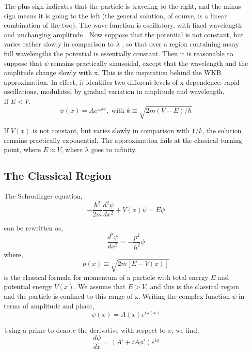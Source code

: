 The plus sign indicates that the particle is traveling to the right, and the minus sign means it is going to the
left (the general solution, of course, is a linear combination of the two). The wave function is oscillatory, with
fixed wavelength and unchanging amplitude . Now suppose that the potential is not constant, but
varies rather slowly in comparison to $\lambda$ , so that over a region containing many full wavelengths the potential is
essentially constant. Then it is reasonable to suppose that $\psi$ remains practically sinusoidal, except that the wavelength and the amplitude change slowly with x. This is the inspiration behind the WKB approximation.
In effect, it identifies two different levels of x-dependence: rapid oscillations, modulated by gradual variation in amplitude and wavelength.\\
If $E<V$,
\begin{equation*}
	\psi(x)=Ae^{\pm kx}, \; \text{with}\; k\equiv\sqrt{2m(V-E)/\hbar}
\end{equation*}

If $V(x)$ is not constant, but varies slowly in comparison with $1/k$, the solution remains practically exponential. The approximation fails at the classical turning point, where $E\approx V$, where $\lambda$ goes to infinity.

\subsection{The Classical Region}
The Schrodinger equation,
\begin{equation*}
	-\frac{\hbar^2}{2m}\frac{d^2\psi}{dx^2}+V(x)\psi=E\psi
\end{equation*}

can be rewritten as,
\begin{equation}
	\frac{d^2\psi}{dx^2}=-\frac{p^2}{\hbar^2}\psi
\end{equation}
where,
\begin{equation}
	p(x)\equiv\sqrt{2m[E-V(x)]}
\end{equation}
is the classical formula for momentum of a particle with total energy $E$ and potential energy $V(x)$. We assume that $E>V$, and this is the classical region and the particle is confined to this range of x. Writing the complex function $\psi$ in terms of amplitude and phase,
\begin{equation}
	\psi(x)=A(x)e^{i\phi(x)}
\end{equation}

Using a prime to denote the derivative with respect to $x$, we find,
\begin{equation*}
	\frac{d\psi}{dx}=(A'+iA\phi')e^{i\phi}
\end{equation*}

